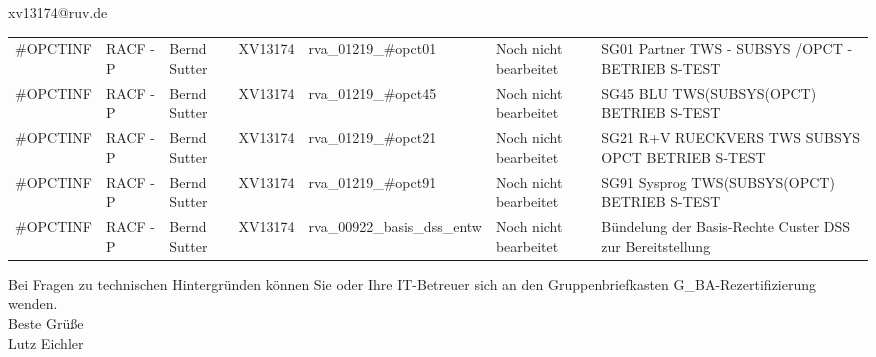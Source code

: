 \documentclass[a4paper,landscape,12pt]{letter}
\begin{document}
\begin{letter}{xv13174@ruv.de\hfill \break}
\begin{tiny}
\begin{longtable}{|p{35mm}|p{15mm}|p{25mm}|p{10mm}|p{40mm}|p{50mm}|p{50mm}|}
\#OPCTINF & RACF - P & Bernd Sutter & XV13174 & rva\_01219\_\#opct01 & Noch nicht bearbeitet & SG01 Partner TWS - SUBSYS /OPCT - BETRIEB S-TEST \\
\#OPCTINF & RACF - P & Bernd Sutter & XV13174 & rva\_01219\_\#opct45 & Noch nicht bearbeitet & SG45 BLU TWS(SUBSYS(OPCT) BETRIEB S-TEST \\
\#OPCTINF & RACF - P & Bernd Sutter & XV13174 & rva\_01219\_\#opct21 & Noch nicht bearbeitet & SG21 R+V RUECKVERS TWS SUBSYS OPCT BETRIEB S-TEST \\
\#OPCTINF & RACF - P & Bernd Sutter & XV13174 & rva\_01219\_\#opct91 & Noch nicht bearbeitet & SG91 Sysprog TWS(SUBSYS(OPCT) BETRIEB S-TEST \\
\#OPCTINF & RACF - P & Bernd Sutter & XV13174 & rva\_00922\_basis\_dss\_entw & Noch nicht bearbeitet & Bündelung der Basis-Rechte Custer DSS zur Bereitstellung \\

\hline
		\end{longtable}
		\end{tiny}
	
\begin{minipage}{\textwidth}
			Bei Fragen zu technischen Hintergründen können Sie 
			oder Ihre IT-Betreuer sich an den Gruppenbriefkasten 
			G\_BA-Rezertifizierung
			wenden.\\
			\linebreak
			Beste Grüße\\
			Lutz Eichler
	\end{minipage}
	\end{letter}
	
\end{document}
